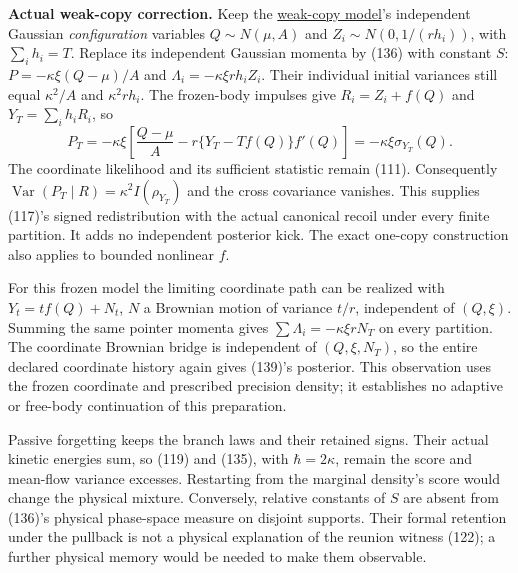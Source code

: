 \documentclass[11pt,a4paper]{article}
\begin{document}
\textbf{Actual weak-copy correction.} Keep the
\href{sed-closure-under-recording.md\#nonlinear-copies-defeat-the-classical-gaussian-extension}{weak-copy
model}'s independent Gaussian \emph{configuration} variables
\(Q\sim N(\mu,A)\) and \(Z_i\sim N(0,1/(rh_i))\), with \(\sum_i h_i=T\).
Replace its independent Gaussian momenta by (136) with constant \(S\):
\(P=-\kappa\xi(Q-\mu)/A\) and \(\Lambda_i=-\kappa\xi rh_iZ_i\). Their
individual initial variances still equal \(\kappa^2/A\) and
\(\kappa^2rh_i\). The frozen-body impulses give \(R_i=Z_i+f(Q)\) and
\(Y_T=\sum_i h_iR_i\), so \[P_T=-\kappa\xi\left[
 \frac{Q-\mu}{A}-r\{Y_T-Tf(Q)\}f'(Q)\right]
 =-\kappa\xi\sigma_{Y_T}(Q).\tag{139}\] The coordinate likelihood and
its sufficient statistic remain (111). Consequently
\(\operatorname{Var}(P_T\mid R)=\kappa^2I(\rho_{Y_T})\) and the cross
covariance vanishes. This supplies (117)'s signed redistribution with
the actual canonical recoil under every finite partition. It adds no
independent posterior kick. The exact one-copy construction also applies
to bounded nonlinear \(f\).

For this frozen model the limiting coordinate path can be realized with
\(Y_t=tf(Q)+N_t\), \(N\) a Brownian motion of variance \(t/r\),
independent of \((Q,\xi)\). Summing the same pointer momenta gives
\(\sum\Lambda_i=-\kappa\xi rN_T\) on every partition. The coordinate
Brownian bridge is independent of \((Q,\xi,N_T)\), so the entire
declared coordinate history again gives (139)'s posterior. This
observation uses the frozen coordinate and prescribed precision density;
it establishes no adaptive or free-body continuation of this
preparation.

Passive forgetting keeps the branch laws and their retained signs. Their
actual kinetic energies sum, so (119) and (135), with \(\hbar=2\kappa\),
remain the score and mean-flow variance excesses. Restarting from the
marginal density's score would change the physical mixture. Conversely,
relative constants of \(S\) are absent from (136)'s physical phase-space
measure on disjoint supports. Their formal retention under the pullback
is not a physical explanation of the reunion witness (122); a further
physical memory would be needed to make them observable.
\end{document}
